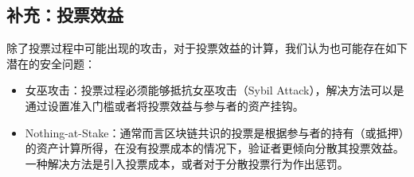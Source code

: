 \subsection{补充：投票效益}
除了投票过程中可能出现的攻击，对于投票效益的计算，我们认为也可能存在如下潜在的安全问题：

\begin{itemize}
	\item 女巫攻击：投票过程必须能够抵抗女巫攻击（Sybil Attack），解决方法可以是通过设置准入门槛或者将投票效益与参与者的资产挂钩。
	\item Nothing-at-Stake：通常而言区块链共识的投票是根据参与者的持有（或抵押）的资产计算所得，在没有投票成本的情况下，验证者更倾向分散其投票效益。一种解决方法是引入投票成本，或者对于分散投票行为作出惩罚\cite{buterin2017casper}。	
\end{itemize}

